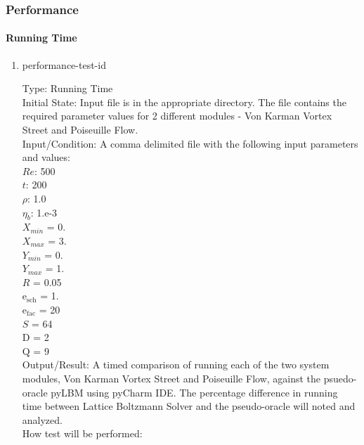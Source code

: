 \documentclass[12pt, titlepage]{article}
\newcommand{\famname}{Lattice Boltzmann Solver}
\newcounter{testcounter} %
\begin{document}
\subsubsection{Performance}
		
\paragraph{Running Time}

\begin{enumerate}

\item{performance-test-id\thetestcounter \\}

Type: Running Time\\
					
Initial State: Input file is in the appropriate directory. The file contains the
required parameter values for 2 different modules - Von Karman Vortex Street and
Poiseuille Flow.\\
					
Input/Condition: A comma delimited file with the following input parameters and values:\\
$Re$: 500\\
$t$: 200\\
$\rho$: 1.0\\
$\eta_b$: 1.e-3\\
$X_{min}$ = 0.\\
$X_{max}$ = 3.\\
$Y_{min}$ = 0.\\
$Y_{max}$ = 1.\\
$R$ = 0.05\\
$\mathrm{e_{sch}}$ = 1.\\
$\mathrm{e_{fac}}$ = 20\\
$S$ = 64\\
$\mathrm{D}$ = 2\\
$\mathrm{Q}$ = 9\\
					
Output/Result: A timed comparison of running
each of the two system modules, Von Karman Vortex Street and Poiseuille Flow,
against the psuedo-oracle pyLBM using pyCharm IDE. The percentage difference in
running time between {\famname} and the pseudo-oracle will noted and analyzed.\\

How test will be performed: 


\end{enumerate}
\end{document}
